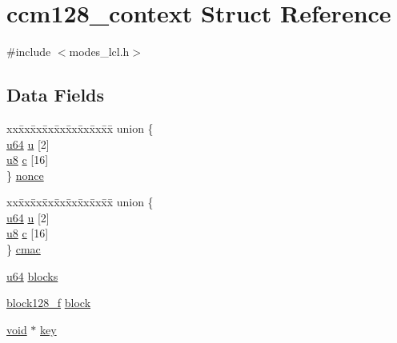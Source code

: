 \hypertarget{structccm128__context}{}\section{ccm128\+\_\+context Struct Reference}
\label{structccm128__context}


{\ttfamily \#include $<$modes\+\_\+lcl.\+h$>$}

\subsection*{Data Fields}
\begin{DoxyCompactItemize}
\item 
\begin{tabbing}
xx\=xx\=xx\=xx\=xx\=xx\=xx\=xx\=xx\=\kill
union \{\\
\>\hyperlink{modes__lcl_8h_ad758b7a5c3f18ed79d2fcd23d9f16357}{u64} \hyperlink{structccm128__context_a1c262682a23875ddb957cb140d21df0a}{u} \mbox{[}2\mbox{]}\\
\>\hyperlink{aes__locl_8h_aed742c436da53c1080638ce6ef7d13de}{u8} \hyperlink{structccm128__context_ae26a622d631b648ed55c8e2338e3a77b}{c} \mbox{[}16\mbox{]}\\
\} \hyperlink{structccm128__context_a64aa94548bdb1a2219af06453070503b}{nonce}\\

\end{tabbing}\item 
\begin{tabbing}
xx\=xx\=xx\=xx\=xx\=xx\=xx\=xx\=xx\=\kill
union \{\\
\>\hyperlink{modes__lcl_8h_ad758b7a5c3f18ed79d2fcd23d9f16357}{u64} \hyperlink{structccm128__context_a1c262682a23875ddb957cb140d21df0a}{u} \mbox{[}2\mbox{]}\\
\>\hyperlink{aes__locl_8h_aed742c436da53c1080638ce6ef7d13de}{u8} \hyperlink{structccm128__context_ae26a622d631b648ed55c8e2338e3a77b}{c} \mbox{[}16\mbox{]}\\
\} \hyperlink{structccm128__context_a5d04f7edf360c2eee2252b3d8d05023f}{cmac}\\

\end{tabbing}\item 
\hyperlink{modes__lcl_8h_ad758b7a5c3f18ed79d2fcd23d9f16357}{u64} \hyperlink{structccm128__context_aeb0f59bd48db07d678f25b6fc87dd3db}{blocks}
\item 
\hyperlink{include_2openssl_2modes_8h_a3be4f2f2fbba3b92b026d8072dd6c3ad}{block128\+\_\+f} \hyperlink{structccm128__context_a59f10af1cb28ada84b1535c0270f51e4}{block}
\item 
\hyperlink{hw__4758__cca_8h_afad4d591c7931ff6dc5bf69c76c96aa0}{void} $\ast$ \hyperlink{structccm128__context_ab5c000aec752f2206131e183daf5efbf}{key}
\end{DoxyCompactItemize}


